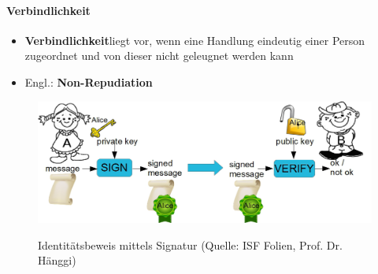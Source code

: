 \paragraph*{Verbindlichkeit}\label{par:Non-Repudiation}
\begin{itemize}
    \item \textbf{Verbindlichkeit}liegt vor, wenn eine Handlung eindeutig einer Person zugeordnet und von dieser nicht geleugnet werden kann
    \item Engl.: \textbf{Non-Repudiation}
\end{itemize}
\begin{figure}[H]
    \begin{center}
    \label{pic:Signature}
    \includegraphics[width=.9\textwidth]{images/sign1.png}
    \caption{Identitätsbeweis mittels Signatur (Quelle: ISF Folien, Prof. Dr. Hänggi)}
    \end{center}
\end{figure}

